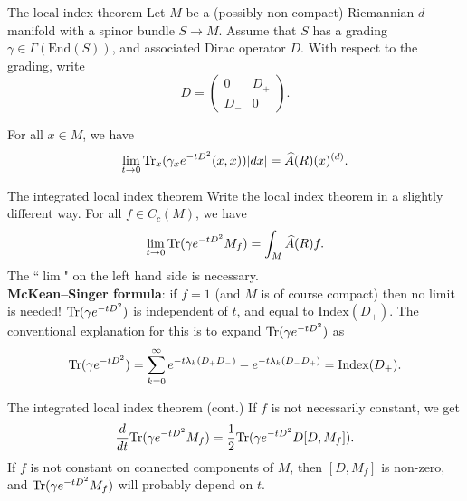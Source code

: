 \documentclass{beamer}
\numberwithin{equation}{section}
\theoremstyle{plain}
\theoremstyle{plain}
\theoremstyle{definition}
\theoremstyle{plain}
\theoremstyle{plain}
\theoremstyle{definition}
\newcommand{\tr}{{\rm Tr}}
\begin{document}
\begin{frame}{The local index theorem}
    Let $M$ be a (possibly non-compact) Riemannian $d$-manifold with a spinor bundle $S\rightarrow M$. Assume that $S$
    has a grading $\gamma\in \Gamma(\mathrm{End}(S))$, and associated Dirac operator $D$. With respect to the grading, write 
    \begin{equation*}
        D = \begin{pmatrix} 0 & D_+\\ D_- & 0 \end{pmatrix}.
    \end{equation*}
    \pause
    \begin{theorem}
        For all $x \in M$, we have
        \begin{equation*}
            \lim_{t\to 0} \tr_x(\gamma_xe^{-tD^2}(x,x))|dx| = \widehat{A}(R)(x)^{(d)}.
        \end{equation*}
    \end{theorem}
\end{frame}

\begin{frame}{The integrated local index theorem}
    Write the local index theorem in a slightly different way. For all $f \in C_c(M)$, we have
    \begin{equation*}
        \lim_{t\to 0} \tr(\gamma e^{-tD^2}M_f) = \int_{M} \widehat{A}(R)f.
    \end{equation*}
    The ``$\lim$" on the left hand side is necessary.\\
    \pause
    \textbf{McKean--Singer formula}: if $f = 1$ (and $M$ is of course compact) then no limit is needed! $\tr(\gamma e^{-tD^2})$
    is independent of $t$, and equal to $\mathrm{Index}(D_+)$. The conventional explanation for this is to expand $\tr(\gamma e^{-tD^2})$ as
    \begin{equation*}
        \tr(\gamma e^{-tD^2}) = \sum_{k=0}^\infty e^{-t\lambda_k(D_+D_-)}-e^{-t\lambda_k(D_-D_+)} = \mathrm{Index}(D_+).
    \end{equation*}
\end{frame}

\begin{frame}{The integrated local index theorem (cont.)}
    If $f$ is not necessarily constant, we get
    \begin{equation*}
        \frac{d}{dt}\tr(\gamma e^{-tD^2}M_f) = \frac{1}{2}\tr(\gamma e^{-tD^2}D[D,M_f]).
    \end{equation*}
    If $f$ is not constant on connected components of $M$, then $[D,M_f]$ is non-zero, and $\tr(\gamma e^{-tD^2}M_f)$ will probably depend on $t$. 
\end{frame}
\end{document}
